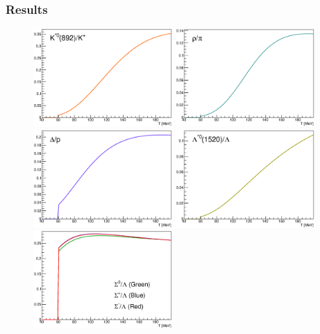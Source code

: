 \subsubsection{Results}
\begin{figure}[!htbp]
\begin{center}
        \includegraphics[width=200px]{./Version1/FigChapter3/KStarToK}
       \includegraphics[width=200px]{./Version1/FigChapter3/RhoToPion}
        \includegraphics[width=200px]{./Version1/FigChapter3/DeltaToProton}
		\includegraphics[width=200px]{./Version1/FigChapter3/LambdaStarToLambda}
		\includegraphics[width=200px]{./Version1/FigChapter3/SigmaRatio}

\end{center}
\end{figure}

